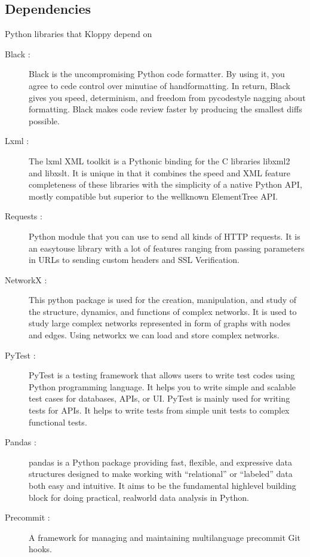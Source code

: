 \documentclass[letterpaper,10pt,english]{jupyterBook}
\begin{document}
\subsection{Dependencies}
\label{\detokenize{Chap1/section1:dependencies}}
\sphinxAtStartPar
Python libraries that Kloppy depend on
\begin{description}
\item[{Black :}] \leavevmode
\sphinxAtStartPar
Black is the uncompromising Python code formatter. By using it, you agree to cede control over minutiae of hand\sphinxhyphen{}formatting. In return, Black gives you speed, determinism, and freedom from pycodestyle nagging about formatting.
Black makes code review faster by producing the smallest diffs possible.

\item[{Lxml :}] \leavevmode
\sphinxAtStartPar
The lxml XML toolkit is a Pythonic binding for the C libraries libxml2 and libxslt. It is unique in that it combines the speed and XML feature completeness of these libraries with the simplicity of a native Python API, mostly compatible but superior to the well\sphinxhyphen{}known ElementTree API.

\item[{Requests :}] \leavevmode
\sphinxAtStartPar
Python module that you can use to send all kinds of HTTP requests. It is an easy\sphinxhyphen{}to\sphinxhyphen{}use library with a lot of features ranging from passing parameters in URLs to sending custom headers and SSL Verification.

\item[{NetworkX :}] \leavevmode
\sphinxAtStartPar
This python package is used for the creation, manipulation, and study of the structure, dynamics, and functions of complex networks. It is used to study large complex networks represented in form of graphs with nodes and edges. Using networkx we can load and store complex networks.

\item[{PyTest :}] \leavevmode
\sphinxAtStartPar
PyTest is a testing framework that allows users to write test codes using Python programming language. It helps you to write simple and scalable test cases for databases, APIs, or UI. PyTest is mainly used for writing tests for APIs. It helps to write tests from simple unit tests to complex functional tests.

\item[{Pandas :}] \leavevmode
\sphinxAtStartPar
pandas is a Python package providing fast, flexible, and expressive data structures designed to make working with “relational” or “labeled” data both easy and intuitive. It aims to be the fundamental high\sphinxhyphen{}level building block for doing practical, real\sphinxhyphen{}world data analysis in Python.

\item[{Pre\sphinxhyphen{}commit :}] \leavevmode
\sphinxAtStartPar
A framework for managing and maintaining multi\sphinxhyphen{}language pre\sphinxhyphen{}commit Git hooks.

\end{description}
\end{document}
